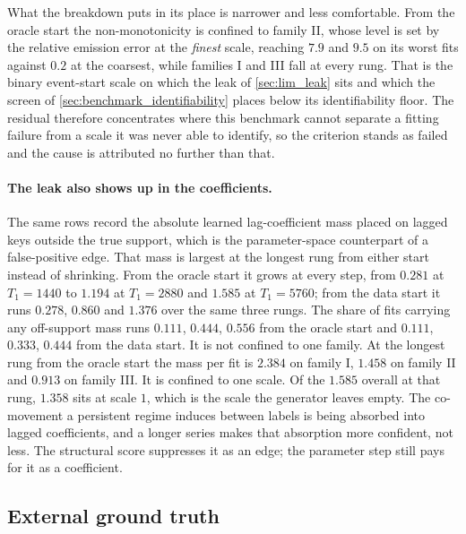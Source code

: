 What the breakdown puts in its place is narrower and less comfortable. From the
oracle start the non-monotonicity is confined to family II, whose level is set
by the relative emission error at the \emph{finest} scale, reaching $7.9$ and
$9.5$ on its worst fits against $0.2$ at the coarsest, while families I and III
fall at every rung. That is the binary event-start scale on which the leak of
\cref{sec:lim_leak} sits and which the screen of
\cref{sec:benchmark_identifiability} places below its identifiability floor. The
residual therefore concentrates where this benchmark cannot separate a fitting
failure from a scale it was never able to identify, so the criterion stands as
failed and the cause is attributed no further than that.

\paragraph{The leak also shows up in the coefficients.}
The same rows record the absolute learned lag-coefficient mass placed on lagged
keys outside the true support, which is the parameter-space counterpart of a
false-positive edge. That mass is largest at the longest rung from either start
instead of shrinking. From the oracle start it grows at every step, from
$0.281$ at $T_1 = 1440$ to $1.194$ at $T_1 = 2880$ and $1.585$ at
$T_1 = 5760$; from the data start it runs $0.278$, $0.860$ and $1.376$ over the
same three rungs. The share of fits carrying any off-support mass runs $0.111$,
$0.444$, $0.556$ from the oracle start and $0.111$, $0.333$, $0.444$ from the
data start. It is not confined to one family. At the longest rung from the
oracle start the mass per fit is $2.384$ on family I, $1.458$ on family II and
$0.913$ on family III. It is confined to one scale. Of the $1.585$ overall at
that rung, $1.358$ sits at scale $1$, which is the scale the generator leaves
empty. The co-movement a persistent regime induces between
labels is being absorbed into
lagged coefficients, and a longer series makes that absorption more confident,
not less. The structural score suppresses it as an edge; the parameter step
still pays for it as a coefficient.

\subsection{External ground truth}
\label{sec:results:external}


